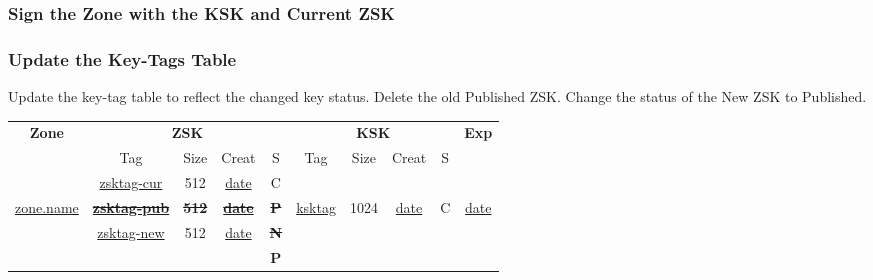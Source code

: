 
\subsubsection{Sign the Zone with the KSK and Current ZSK}







\subsubsection{Update the Key-Tags Table}

Update the key-tag table to reflect the changed key status.  Delete the old
Published ZSK. Change the status of the New ZSK to Published.

\begin{center}
\begin{tabular}{|c|c|c|c|c|c|c|c|c|c|}
\hline
{\bf Zone} &
\multicolumn{4}{c|}{{\bf ZSK}} &
\multicolumn{4}{c|}{{\bf KSK}} &
{\bf Exp} \\
\cline{2-9}

 & Tag & Size & Creat & S & Tag & Size & Creat & S & \\
\hline

			&
\underline{zsktag-cur}	&
512			&
\underline{date}	&
C			&
& & & & \\

\cline{2-9}

\underline{zone.name}			&
{\bf \sout{\underline{zsktag-pub}}}	&
{\bf \sout{512}}			&
{\bf \sout{\underline{date}}}		&
{\bf \sout{P}}				&
\underline{ksktag}			&
1024					&
\underline{date}			&
C					&
\underline{date}			\\

\cline{2-9}

			&
\underline{zsktag-new}	&
512			&
\underline{date}	&
{\bf \sout{N}}		&
& & & & \\

			&
			&
			&
			&
{\bf P}			&
& & & & \\

\hline
\end{tabular}
\end{center}





